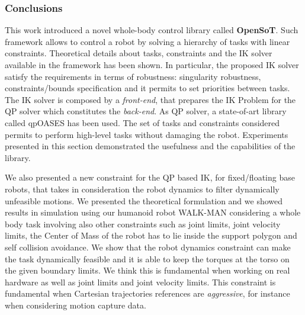 \subsubsection{Conclusions}
\label{sec:conclusions}
This work introduced a novel whole-body control library called \textbf{OpenSoT}. Such framework allows to control a robot by solving a hierarchy of tasks with linear constraints. 
Theoretical details about tasks, constraints and the IK solver available in the framework has been shown. In particular, the proposed IK solver satisfy the requirements in terms of robustness: singularity robustness, constraints/bounds specification and it permits to set priorities between tasks. The IK solver is composed by a \emph{front-end}, that prepares the IK Problem for the QP solver which constitutes the \emph{back-end}. As QP solver, a state-of-art library called qpOASES has been used.
The set of tasks and constraints considered permits to perform high-level tasks without damaging the robot. Experiments presented in this section demonstrated the usefulness and the capabilities of the library.

We also presented a new constraint for the QP based IK, for fixed/floating base robots, that takes in consideration the robot dynamics to filter dynamically unfeasible motions. We presented the theoretical formulation and we showed results in simulation using our humanoid robot WALK-MAN considering a whole body task involving also other constraints such as joint limits, joint velocity limits, the Center of Mass of the robot has to lie inside the support polygon and self collision avoidance. We show that the robot dynamics constraint can make the task dynamically feasible and it is able to keep the torques at the torso on the given boundary limits. We think this is fundamental when working on real hardware as well as joint limits and joint velocity limits. This constraint is fundamental when Cartesian trajectories references are \emph{aggressive}, for instance when considering motion capture data. 

